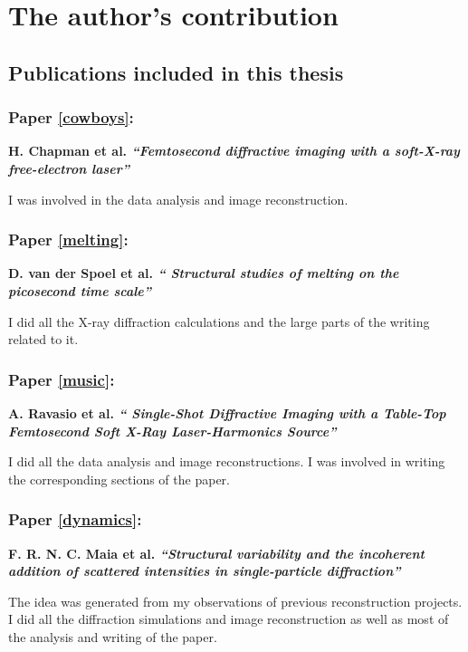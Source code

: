 \chapter{The author's contribution}

\section*{Publications included in this thesis}

\vspace{1cm}

\subsection*{Paper \ref{cowboys}:}{\bf H. Chapman et al. \noindent
{\em ``Femtosecond diffractive imaging with a soft-X-ray free-electron laser''}}

\noindent
I was involved in the data analysis and image reconstruction.

\noindent
\subsection*{Paper \ref{melting}:}{\bf D. van der Spoel et al. {\em ``
 Structural studies of melting on the picosecond time scale''}}

\noindent I did all the X-ray diffraction calculations and the large parts of
the writing related to it.

\noindent
\subsection*{Paper \ref{music}:}{\bf A. Ravasio et al. {\em `` 
Single-Shot Diffractive Imaging with a Table-Top
      Femtosecond Soft X-Ray Laser-Harmonics Source''}}

\noindent I did all the data analysis and  image reconstructions. I was involved
in writing the corresponding sections of the paper.

\noindent
\subsection*{Paper \ref{dynamics}:}{\bf F. R. N. C. Maia et al. {\em ``Structural variability and the incoherent addition of scattered
      intensities in single-particle diffraction''}}

\noindent The idea was generated from my observations of previous reconstruction
projects. I did all the diffraction simulations and image reconstruction as well
as most of the analysis and writing of the paper.

